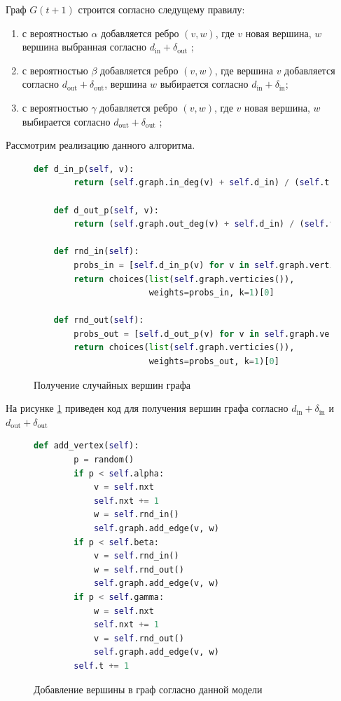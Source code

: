 Граф $G(t+1)$ строится согласно следущему правилу:
 \begin{enumerate}
    \item с вероятностью $\alpha$ добавляется ребро  $(v,w)$,
        где  $v$ новая вершина,  $w$ вершина выбранная согласно  $d_{\text{in}} + \delta_{\text{out}}$ ;
    \item с вероятностью $\beta$ добавляется ребро  $(v,w)$,
        где вершина  $v$ добавляется согласно  $d_{\text{out}} + \delta_{\text{out}}$, вершина $w$ выбирается согласно  $d_{\text{in}} + \delta_{\text{in}}$;
     \item с вероятностью $\gamma$ добавляется ребро  $(v,w)$,
         где  $v$ новая вершина,  $w$ выбирается согласно 
         $d_{\text{out}} + \delta_{\text{out}}$ ;
\end{enumerate}
Рассмотрим реализацию данного алгоритма.
\begin{figure}[H] 
\begin{lstlisting}[language=Python] 
    def d_in_p(self, v):
        return (self.graph.in_deg(v) + self.d_in) / (self.t + self.d_in * self.graph.k_vertecies())

    def d_out_p(self, v):
        return (self.graph.out_deg(v) + self.d_in) / (self.t + self.d_out * self.graph.k_vertecies())

    def rnd_in(self):
        probs_in = [self.d_in_p(v) for v in self.graph.verticies()]
        return choices(list(self.graph.verticies()),
                       weights=probs_in, k=1)[0]

    def rnd_out(self):
        probs_out = [self.d_out_p(v) for v in self.graph.verticies()]
        return choices(list(self.graph.verticies()),
                       weights=probs_out, k=1)[0]
\end{lstlisting}  
    \caption{Получение случайных вершин графа}
    \label{orrnd_1}
\end{figure} 
На рисунке \ref{orrnd_1} приведен код для получения вершин 
графа согласно $d_{\text{in}} + \delta_{\text{in}}$ и $d_{\text{out}} +
\delta_{\text{out}}$
\begin{figure}[H] 
\begin{lstlisting}[language=Python] 
    def add_vertex(self):
        p = random()
        if p < self.alpha:
            v = self.nxt
            self.nxt += 1
            w = self.rnd_in()
            self.graph.add_edge(v, w)
        if p < self.beta:
            v = self.rnd_in()
            w = self.rnd_out()
            self.graph.add_edge(v, w)
        if p < self.gamma:
            w = self.nxt
            self.nxt += 1
            v = self.rnd_out()
            self.graph.add_edge(v, w)
        self.t += 1
\end{lstlisting}  
    \caption{Добавление вершины в граф согласно данной модели}
    \label{orrnd_2}
\end{figure} 
